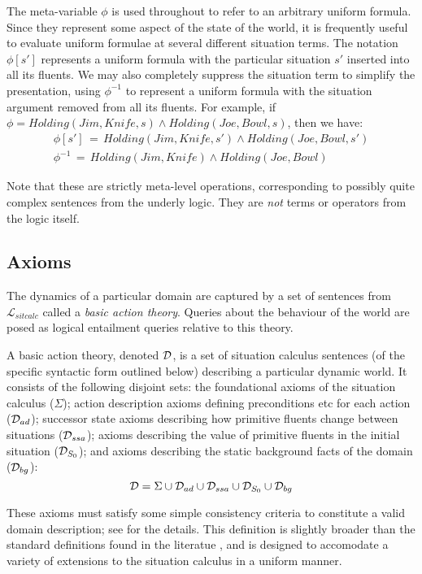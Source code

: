 The meta-variable $\phi$ is used throughout to refer to an arbitrary
uniform formula. Since they represent some aspect of the state of
the world, it is frequently useful to evaluate uniform formulae at
several different situation terms. The notation $\phi[s']$ represents
a uniform formula with the particular situation $s'$ inserted into
all its fluents. We may also completely suppress the situation term
to simplify the presentation, using $\phi^{-1}$ to represent a uniform
formula with the situation argument removed from all its fluents.
For example, if $\phi=Holding(Jim,Knife,s)\wedge Holding(Joe,Bowl,s)$,
then we have:\begin{gather*}
\phi[s']\,=\, Holding(Jim,Knife,s')\wedge Holding(Joe,Bowl,s')\\
\phi^{-1}\,=\, Holding(Jim,Knife)\wedge Holding(Joe,Bowl)\end{gather*}


Note that these are strictly meta-level operations, corresponding
to possibly quite complex sentences from the underly logic. They are
\emph{not} terms or operators from the logic itself.


\subsection{Axioms\label{sec:Background:SC:Axioms}}

The dynamics of a particular domain are captured by a set of sentences
from $\mathcal{L}_{sitcalc}$ called a \emph{basic action theory}.
Queries about the behaviour of the world are posed as logical entailment
queries relative to this theory.

\begin{defnL}
 A basic action theory, denoted
$\mathcal{D}$, is a set of situation calculus sentences (of the specific
syntactic form outlined below) describing a particular dynamic world.
It consists of the following disjoint sets: the foundational axioms
of the situation calculus ($\Sigma$); action description axioms defining
preconditions etc for each action ($\mathcal{D}_{ad}$); successor state axioms
describing how primitive fluents change between situations ($\mathcal{D}_{ssa}$);
axioms describing the value of primitive fluents in the initial situation
($\mathcal{D}_{S_{0}}$); and axioms describing the static background facts
of the domain ($\mathcal{D}_{bg}$):\[
\mathcal{D}=\Sigma\cup\mathcal{D}_{ad}\cup\mathcal{D}_{ssa}\cup\mathcal{D}_{S_{0}}\cup\mathcal{D}_{bg}\]

\end{defnL}
These axioms must satisfy some simple consistency criteria to constitute
a valid domain description; see \citep{pirri99contributions_sitcalc}
for the details. This definition is slightly broader than the standard
definitions found in the literatue \citep{levesque98sc_foundations,pirri99contributions_sitcalc,reiter01kia},
and is designed to accomodate a variety of extensions to the situation
calculus in a uniform manner.

